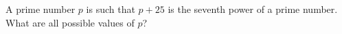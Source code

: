 A prime number $p$ is such that $p+25$ is the seventh power of a prime number. What are all possible values of $p$?
